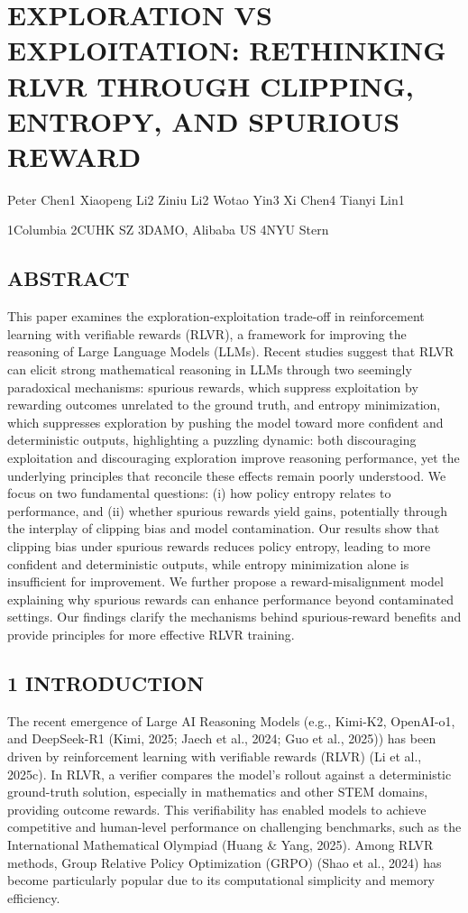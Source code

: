 \documentclass[
  10
]{article}
\author{}
\date{}
\begin{document}
\section{EXPLORATION VS EXPLOITATION: RETHINKING RLVR THROUGH CLIPPING,
ENTROPY, AND SPURIOUS
REWARD}\label{exploration-vs-exploitation-rethinking-rlvr-through-clipping-entropy-and-spurious-reward}

Peter Chen1 Xiaopeng Li2 Ziniu Li2 Wotao Yin3 Xi Chen4 Tianyi Lin1

1Columbia 2CUHK SZ 3DAMO, Alibaba US 4NYU Stern

\subsection{ABSTRACT}\label{abstract}

This paper examines the exploration-exploitation trade-off in
reinforcement learning with verifiable rewards (RLVR), a framework for
improving the reasoning of Large Language Models (LLMs). Recent studies
suggest that RLVR can elicit strong mathematical reasoning in LLMs
through two seemingly paradoxical mechanisms: spurious rewards, which
suppress exploitation by rewarding outcomes unrelated to the ground
truth, and entropy minimization, which suppresses exploration by pushing
the model toward more confident and deterministic outputs, highlighting
a puzzling dynamic: both discouraging exploitation and discouraging
exploration improve reasoning performance, yet the underlying principles
that reconcile these effects remain poorly understood. We focus on two
fundamental questions: (i) how policy entropy relates to performance,
and (ii) whether spurious rewards yield gains, potentially through the
interplay of clipping bias and model contamination. Our results show
that clipping bias under spurious rewards reduces policy entropy,
leading to more confident and deterministic outputs, while entropy
minimization alone is insufficient for improvement. We further propose a
reward-misalignment model explaining why spurious rewards can enhance
performance beyond contaminated settings. Our findings clarify the
mechanisms behind spurious-reward benefits and provide principles for
more effective RLVR training.

\subsection{1 INTRODUCTION}\label{introduction}

The recent emergence of Large AI Reasoning Models (e.g., Kimi-K2,
OpenAI-o1, and DeepSeek-R1 (Kimi, 2025; Jaech et al., 2024; Guo et al.,
2025)) has been driven by reinforcement learning with verifiable rewards
(RLVR) (Li et al., 2025c). In RLVR, a verifier compares the model's
rollout against a deterministic ground-truth solution, especially in
mathematics and other STEM domains, providing outcome rewards. This
verifiability has enabled models to achieve competitive and human-level
performance on challenging benchmarks, such as the International
Mathematical Olympiad (Huang \& Yang, 2025). Among RLVR methods, Group
Relative Policy Optimization (GRPO) (Shao et al., 2024) has become
particularly popular due to its computational simplicity and memory
efficiency.
\end{document}

